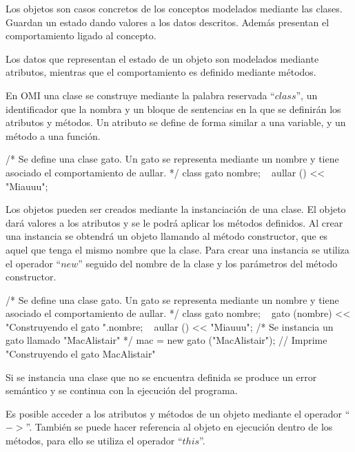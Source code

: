 Los objetos son casos concretos de los conceptos modelados mediante las clases. Guardan un estado dando valores a los datos descritos.
Además presentan el comportamiento ligado al concepto. 

Los datos que representan el estado de un objeto son modelados mediante atributos, mientras que el comportamiento es definido mediante métodos.

En OMI una clase se construye mediante la palabra reservada ``$class$'', un identificador que la nombra y un bloque de sentencias en la que se 
definirán los atributos y métodos. Un atributo se define de forma similar a una variable, y un método a una función. \\

\begin{myverbatim}
   /*
      Se define una clase gato. Un gato 
      se representa mediante un nombre y tiene
      asociado el comportamiento de aullar.
   */
   class gato {
      nombre;
      ~ aullar () {
         << "Miauuu";
      }
   }
\end{myverbatim}

Los objetos pueden ser creados mediante la instanciación de una clase. El objeto dará valores
a los atributos y se le podrá aplicar los métodos definidos. Al crear una instancia se 
obtendrá un objeto llamando al método constructor, que es aquel que tenga el mismo nombre que la clase. 
Para crear una instancia se utiliza el operador ``$new$'' seguido del nombre de la clase y los parámetros 
del método constructor. \\ 

\begin{myverbatim}
   /*
      Se define una clase gato. Un gato 
      se representa mediante un nombre y tiene
      asociado el comportamiento de aullar.
   */
   class gato {
      nombre;
      ~ gato (nombre) {
         << "Construyendo el gato ".nombre;
      }
      ~ aullar () {
         << "Miauuu";
      }
   }
   /*
      Se instancia un gato 
      llamado "MacAlistair"
   */
   mac = new gato ("MacAlistair"); // Imprime "Construyendo el gato MacAlistair"
\end{myverbatim}

Si se instancia una clase que no se encuentra definida se produce un error semántico y se continua con la ejecución del programa.

Es posible acceder a los atributos y métodos de un objeto mediante el operador ``$->$''.
También se puede hacer referencia al objeto en ejecución dentro de los métodos, para ello se utiliza el operador ``$this$''. \\


